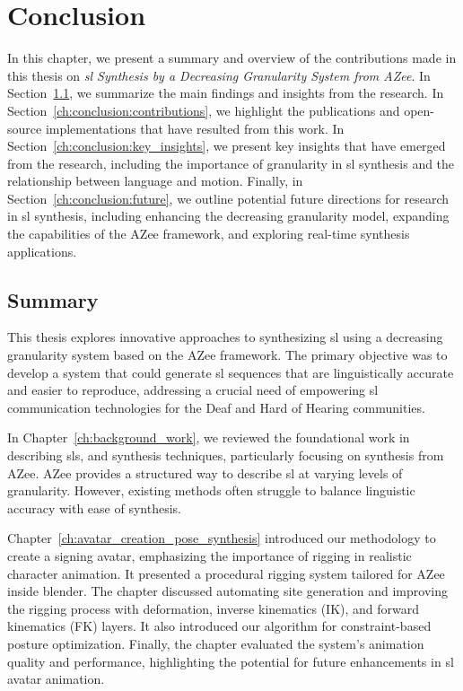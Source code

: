\documentclass[../../main.tex]{subfiles}
\begin{document}
\chapter{Conclusion}
\label{ch:conclusion}

In this chapter, we present a summary and overview of the contributions made in this thesis on \textit{\gls{sl} Synthesis by a Decreasing Granularity System from AZee}. In Section~\ref{ch:conclusion:summary}, we summarize the main findings and insights from the research. In Section~\ref{ch:conclusion:contributions}, we highlight the publications and open-source implementations that have resulted from this work. In Section~\ref{ch:conclusion:key_insights}, we present key insights that have emerged from the research, including the importance of granularity in \gls{sl} synthesis and the relationship between language and motion. Finally, in Section~\ref{ch:conclusion:future}, we outline potential future directions for research in \gls{sl} synthesis, including enhancing the decreasing granularity model, expanding the capabilities of the AZee framework, and exploring real-time synthesis applications.

\section{Summary}
\label{ch:conclusion:summary}

This thesis explores innovative approaches to synthesizing \gls{sl} using a decreasing granularity system based on the AZee framework. The primary objective was to develop a system that could generate \gls{sl} sequences that are linguistically accurate and easier to reproduce, addressing a crucial need of empowering \gls{sl} communication technologies for the Deaf and Hard of Hearing communities.

In Chapter~\ref{ch:background_work}, we reviewed the foundational work in describing \gls{sl}s, and synthesis techniques, particularly focusing on synthesis from AZee. AZee provides a structured way to describe \gls{sl} at varying levels of granularity. However, existing methods often struggle to balance linguistic accuracy with ease of synthesis. 

Chapter~\ref{ch:avatar_creation_pose_synthesis} introduced our methodology to create a signing avatar, emphasizing the importance of rigging in realistic character animation. It presented a procedural rigging system tailored for AZee inside blender. The chapter discussed automating site generation and improving the rigging process with deformation, inverse kinematics (IK), and forward kinematics (FK) layers. It also introduced our algorithm for constraint-based posture optimization. Finally, the chapter evaluated the system’s animation quality and performance, highlighting the potential for future enhancements in \gls{sl} avatar animation. 
\end{document}
